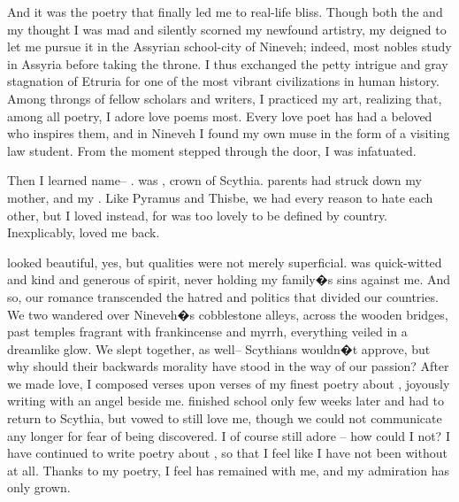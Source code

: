 \documentclass[char]{Kos}
\begin{document}
And it was the poetry that finally led me to real-life bliss. Though both the \cEtruriaKing{\monarch} and my \cGroom{\nickname} thought I was mad and silently scorned my newfound artistry, my \cEtruriaKing{\parent} deigned to let me pursue it in the Assyrian school-city of Nineveh; indeed, most nobles study in Assyria before taking the throne. I thus exchanged the petty intrigue and gray stagnation of Etruria for one of the most vibrant civilizations in human history. Among throngs of fellow scholars and writers, I practiced my art, realizing that, among all poetry, I adore love poems most. Every love poet has had a beloved who inspires them, and in Nineveh I found my own muse in the form of a visiting law student. From the moment \cBride{\they} stepped through the door, I was infatuated.

Then I learned \cBride{\their} name-- \cBride{\nickname}. \cBride{\They} was \cBride{\nickname}, crown \cBride{\prince} of Scythia. \cBride{\Their} parents had struck down my mother, and my \cEtruriaKing{\parent} \cBride{\their} \cFugitive{\sibling}. Like Pyramus and Thisbe, we had every reason to hate each other, but I loved \cBride{\them} instead, for \cBride{\they} was too lovely to be defined by \cBride{\their} country. Inexplicably, \cBride{\they} loved me back.

\cBride{\nickname} looked beautiful, yes, but \cBride{\their} qualities were not merely superficial. \cBride{\They} was quick-witted and kind and generous of spirit, never holding my family�s sins against me. And so, our romance transcended the hatred and politics that divided our countries. We two wandered over Nineveh�s cobblestone alleys, across the wooden bridges, past temples fragrant with frankincense and myrrh, everything veiled in a dreamlike glow. We slept together, as well-- Scythians wouldn�t approve, but why should their backwards morality have stood in the way of our passion? After we made love, I composed verses upon verses of my finest poetry about \cBride{\them}, joyously writing with an angel beside me. \cBride{\They} finished school only few weeks later and had to return to Scythia, but \cBride{\they} vowed to still love me, though we could not communicate any longer for fear of being discovered. I of course still adore \cBride{\them}-- how could I not? I have continued to write poetry about \cBride{\them}, so that I feel like I have not been without \cBride{\them} at all. Thanks to my poetry, I feel \cBride{\they} has remained with me, and my admiration has only grown.
\end{document}

